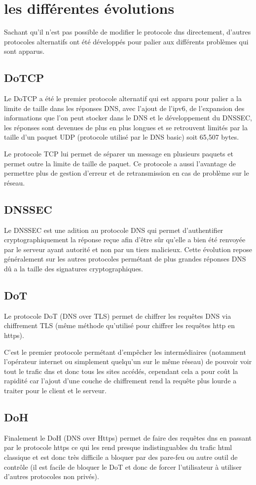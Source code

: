 \section{les différentes évolutions}
Sachant qu’il n’est pas possible de modifier le protocole dns directement, d’autres protocoles alternatifs ont été développés pour palier aux différents problèmes qui sont apparus.
\subsection{DoTCP}
Le DoTCP \cite{dotcpRFC} a été le premier protocole alternatif qui est apparu pour palier a la limite de taille dans les réponses DNS, avec l’ajout de l’ipv6, de l’expansion des informations que l’on peut stocker dans le DNS et le développement du DNSSEC, les réponses sont devenues de plus en plus longues et se retrouvent limités par la taille d’un paquet UDP (protocole utilisé par le DNS basic) soit 65,507 bytes.

Le protocole TCP lui permet de séparer un message en plusieurs paquets et permet outre la limite de taille de paquet. Ce protocole a aussi l’avantage de permettre plus de gestion d’erreur et de retransmission en cas de problème sur le réseau.

\subsection{DNSSEC}
Le DNSSEC \cite{dnssecRFC} est une adition au protocole DNS qui permet d’authentifier cryptographiquement la réponse reçue afin d’être sûr qu’elle a bien été renvoyée par le serveur ayant autorité et non par un tiers malicieux.
Cette évolution repose généralement sur les autres protocoles permétant de plus grandes réponses DNS dû a la taille des signatures cryptographiques.

\subsection{DoT}
Le protocole DoT \cite{dotRFC} (DNS over TLS) permet de chiffrer les requêtes DNS via chiffrement TLS (même méthode qu’utilisé pour chiffrer les requêtes http en https).

C'est le premier protocole permétant d’empêcher les intermédiaires (notamment l’opérateur internet ou simplement quelqu’un sur le même réseau) de pouvoir voir tout le trafic dns et donc tous les sites accédés, cependant cela a pour coût la rapidité car l’ajout d’une couche de chiffrement rend la requête plus lourde a traiter pour le client et le serveur.

\subsection{DoH}
Finalement le DoH \cite{dohRFC} (DNS over Https) permet de faire des requêtes dns en passant par le protocole https ce qui les rend presque indistinguables du trafic html classique et est donc très difficile a bloquer par des pare-feu ou autre outil de contrôle (il est facile de bloquer le DoT et donc de forcer l’utilisateur à utiliser d’autres protocoles non privés). 
